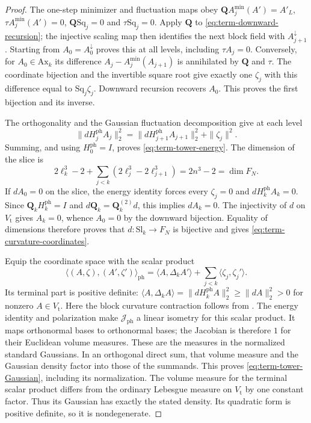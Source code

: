\begin{proof}
The one-step minimizer and fluctuation maps obey
$\mathbf QA_j^{\min}(A')=A'_L$, $\tau A_j^{\min}(A')=0$,
$\mathbf Q\mathrm{Sq}_j=0$ and $\tau\mathrm{Sq}_j=0$.
Apply $\mathbf Q$ to \eqref{eq:term-downward-recursion};
the injective scaling map then identifies the next
block field with $A_{j+1}^\downarrow$.
Starting from $A_0=A_0^\downarrow$ proves this at all
levels, including $\tau A_j=0$.
Conversely, for $A_0\in\mathrm{Ax}_k$ its difference
$A_j-A_j^{\min}(A_{j+1})$ is annihilated by $\mathbf Q$ and
$\tau$. The coordinate bijection
\cite[(21)]{MaxwellBlock} and the invertible
square root give exactly one $\zeta_j$ with this
difference equal to $\mathrm{Sq}_j\zeta_j$.
Downward recursion recovers $A_0$.
This proves the first bijection and its inverse.

The orthogonality
\cite[(28)]{MaxwellBlock}
and the Gaussian fluctuation decomposition give
at each level
\[
 \|dH_j^{\mathrm{ph}}A_j\|_2^2
       =\|dH_{j+1}^{\mathrm{ph}}A_{j+1}\|_2^2+\|\zeta_j\|^2 .
\]
Summing, and using $H_0^{\mathrm{ph}}=I$, proves
\eqref{eq:term-tower-energy}.
The dimension of the slice is
\[
 2\ell_k^3-2+\sum_{j<k}(2\ell_j^3-2\ell_{j+1}^3)
                                                    =2n^3-2=\dim F_N.
\]
If $dA_0=0$ on the slice, the energy identity forces
every $\zeta_j=0$ and $dH_k^{\mathrm{ph}}A_k=0$.
Since $\mathbf Q_kH_k^{\mathrm{ph}}=I$ and
$d\mathbf Q_k=\mathbf Q_k^{(2)}d$,
this implies $dA_k=0$.
The injectivity of $d$ on $V_{\mathrm t}$ gives
$A_k=0$, whence $A_0=0$ by the downward bijection.
Equality of dimensions therefore proves that
$d:\mathrm{Sl}_k\to F_N$ is bijective and gives
\eqref{eq:term-curvature-coordinates}.

Equip the coordinate space with the scalar product
\[
 \langle(A,\zeta),(A',\zeta')\rangle_{\mathrm{ph}}
       =\langle A,\Delta_kA'\rangle
                                      +\sum_{j<k}\langle\zeta_j,\zeta_j'\rangle.
\]
Its terminal part is positive definite:
$\langle A,\Delta_kA\rangle
=\|dH_k^{\mathrm{ph}}A\|_2^2\ge\|dA\|_2^2>0$
for nonzero $A\in V_{\mathrm t}$.
Here the block curvature contraction follows from
\cite[(5)]{MaxwellBlock}.
The energy identity and polarization make
$\mathcal J_{\mathrm{ph}}$ a linear isometry for
this scalar product.
It maps orthonormal bases to orthonormal bases;
the Jacobian is therefore $1$ for their Euclidean
volume measures. These are the measures in the
normalized standard Gaussians.
In an orthogonal direct sum, that volume measure
and the Gaussian density factor into those of
the summands. This proves
\eqref{eq:term-tower-Gaussian}, including its normalization.
The volume measure for the terminal scalar product
differs from the ordinary Lebesgue measure on
$V_{\mathrm t}$ by one constant factor.
Thus its Gaussian has exactly the stated density.
Its quadratic form is positive definite, so it is
nondegenerate.


\end{proof}
